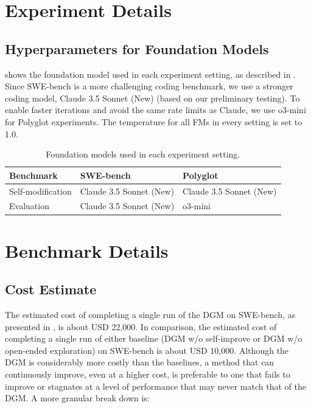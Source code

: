 \documentclass{article} %
\begin{document}
\section{Experiment Details}

\subsection{Hyperparameters for Foundation Models}
\label{app:fm-hyperparam}

 shows the foundation model used in each experiment setting, as described in . Since SWE-bench is a more challenging coding benchmark, we use a stronger coding model, Claude 3.5 Sonnet (New) (based on our preliminary testing). To enable faster iterations and avoid the same rate limits as Claude, we use o3-mini for Polyglot experiments. The temperature for all FMs in every setting is set to 1.0.

\begin{table}[H]
\centering
\caption{Foundation models used in each experiment setting.}
\label{tab:fm-hyperparam}
\begin{tabular}{@{}lll@{}}
\toprule
Benchmark & SWE-bench & Polyglot \\ \midrule
Self-modification & Claude 3.5 Sonnet (New) & Claude 3.5 Sonnet (New) \\
Evaluation & Claude 3.5 Sonnet (New) & o3-mini \\ \bottomrule
\end{tabular}
\end{table}

\section{Benchmark Details}

\subsection{Cost Estimate}
\label{app:cost-estimate}

The estimated cost of completing a single run of the DGM on SWE-bench, as presented in , is about USD 22,000. In comparison, the estimated cost of completing a single run of either baseline (DGM w/o self-improve or DGM w/o open-ended exploration) on SWE-bench is about USD 10,000. Although the DGM is considerably more costly than the baselines, a method that can continuously improve, even at a higher cost, is preferable to one that fails to improve or stagnates at a level of performance that may never match that of the DGM. A more granular break down is:
\end{document}
